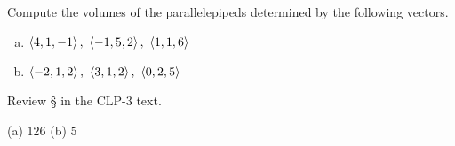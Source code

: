 \begin{question}
Compute the volumes of the parallelepipeds determined by the
following vectors.
\begin{enumerate}[(a)]
\item
 $\llt 4,1,-1\rgt,\ \llt -1,5,2\rgt,\ \llt 1,1,6\rgt$ 
\item
  $\llt -2,1,2\rgt,\ \llt 3,1,2\rgt,\ \llt 0,2,5\rgt$
\end{enumerate}
\end{question}

\begin{hint}
Review \S{} in the CLP-3 text.
\end{hint}

\begin{answer}
(a) $126$\qquad
(b) $5$
\end{answer}

